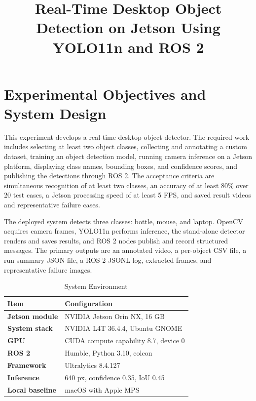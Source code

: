 \documentclass[a4paper,conference]{IEEEtran}
\title{Real-Time Desktop Object Detection on Jetson Using YOLO11n and ROS 2}
\author{\IEEEauthorblockN{Experiment 1: Object Detection and Recognition}
\IEEEauthorblockA{Student: Hantong Bai\quad Student ID: 24020036003\\
Completion Date: September 6, 2026}}
\begin{document}
\maketitle

\section{Experimental Objectives and System Design}

This experiment develops a real-time desktop object detector. The required work includes selecting at least two object classes, collecting and annotating a custom dataset, training an object detection model, running camera inference on a Jetson platform, displaying class names, bounding boxes, and confidence scores, and publishing the detections through ROS 2. The acceptance criteria are simultaneous recognition of at least two classes, an accuracy of at least 80\% over 20 test cases, a Jetson processing speed of at least 5 FPS, and saved result videos and representative failure cases.

The deployed system detects three classes: bottle, mouse, and laptop. OpenCV acquires camera frames, YOLO11n performs inference, the stand-alone detector renders and saves results, and ROS 2 nodes publish and record structured messages. The primary outputs are an annotated video, a per-object CSV file, a run-summary JSON file, a ROS 2 JSONL log, extracted frames, and representative failure images.

\begin{table}[!t]
\caption{System Environment}
\label{tab:env}
\centering
\footnotesize
\begin{tabularx}{\columnwidth}{>{\bfseries}p{}X}
\toprule
Item & Configuration \\
\midrule
Jetson module & NVIDIA Jetson Orin NX, 16 GB \\
System stack & NVIDIA L4T 36.4.4, Ubuntu GNOME \\
GPU & CUDA compute capability 8.7, device 0 \\
ROS 2 & Humble, Python 3.10, colcon \\
Framework & Ultralytics 8.4.127 \\
Inference & 640 px, confidence 0.35, IoU 0.45 \\
Local baseline & macOS with Apple MPS \\
\bottomrule
\end{tabularx}
\end{table}
\end{document}
